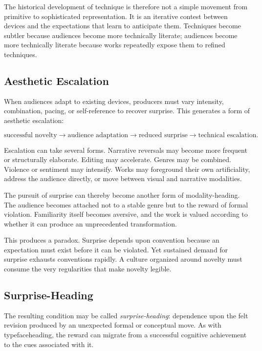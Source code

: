 \documentclass[11pt]{article}
\newcommand{\term}[1]{\emph{#1}}
\begin{document}
The historical development of technique is therefore not a simple movement
from primitive to sophisticated representation. It is an iterative contest
between devices and the expectations that learn to anticipate them.
Techniques become subtler because audiences become more technically literate;
audiences become more technically literate because works repeatedly expose
them to refined techniques.

\subsection{Aesthetic Escalation}

When audiences adapt to existing devices, producers must vary intensity,
combination, pacing, or self-reference to recover surprise. This generates a
form of aesthetic escalation:

\begin{equation}
  \text{successful novelty}
  \longrightarrow
  \text{audience adaptation}
  \longrightarrow
  \text{reduced surprise}
  \longrightarrow
  \text{technical escalation}.
  \label{eq:aesthetic-escalation}
\end{equation}

Escalation can take several forms. Narrative reversals may become more
frequent or structurally elaborate. Editing may accelerate. Genres may be
combined. Violence or sentiment may intensify. Works may foreground their own
artificiality, address the audience directly, or move between visual and
narrative modalities.

The pursuit of surprise can thereby become another form of modality-heading.
The audience becomes attached not to a stable genre but to the reward of
formal violation. Familiarity itself becomes aversive, and the work is valued
according to whether it can produce an unprecedented transformation.

This produces a paradox. Surprise depends upon convention because an
expectation must exist before it can be violated. Yet sustained demand for
surprise exhausts conventions rapidly. A culture organized around novelty
must consume the very regularities that make novelty legible.

\subsection{Surprise-Heading}

The resulting condition may be called \term{surprise-heading}: dependence
upon the felt revision produced by an unexpected formal or conceptual move.
As with typefaceheading, the reward can migrate from a successful cognitive
achievement to the cues associated with it.
\end{document}
